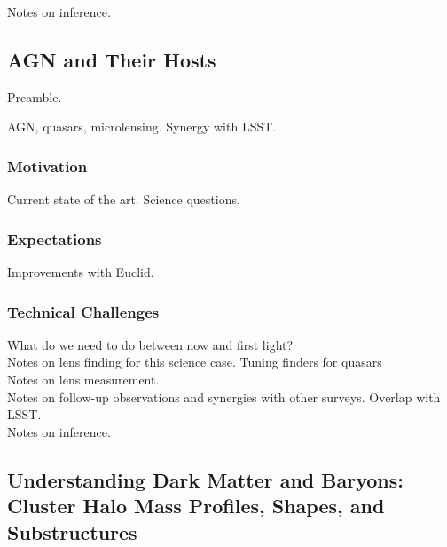 \documentclass[twocolumn]{svjour3}
\begin{document}
Notes on inference.\\



\subsection{AGN and Their Hosts}



Preamble.

AGN, quasars, microlensing.
Synergy with LSST.

\subsubsection{Motivation}
Current state of the art. Science questions.\\

\subsubsection{Expectations}
Improvements with Euclid.\\

\subsubsection{Technical Challenges}

What do we need to do between now and first light?\\

Notes on lens finding for this science case. Tuning finders for
quasars\\

Notes on lens measurement.\\

Notes on follow-up observations and synergies with other surveys.
Overlap with LSST.\\

Notes on inference.\\



\subsection{Understanding Dark Matter and Baryons: Cluster Halo Mass
Profiles, Shapes, and Substructures}
\end{document}
